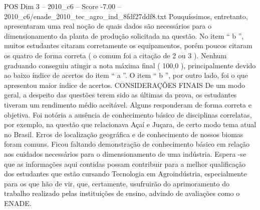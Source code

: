\begin{textsample}{POS Dim 3 – 2010\_c6 – Score -7.00 – 2010\_c6/enade\_2010\_tec\_agro\_ind\_8fdf27ddf8.txt}
Pouquíssimos, entretanto, apresentaram uma real noção de quais dados são necessários para o dimensionamento da planta de produção solicitada na questão.
No item “ b ”, muitos estudantes citaram corretamente os equipamentos, porém poucos citaram os quatro de forma correta ( o comum foi a citação de 2 ou 3 ).
Nenhum graduando conseguiu atingir a nota máxima final ( 100,0 ), principalmente devido ao baixo índice de acertos do item “ a ”.
O item “ b ”, por outro lado, foi o que apresentou maior índice de acertos.
CONSIDERAÇÕES FINAIS De um modo geral, a despeito das questões terem sido as últimas da prova, os estudantes tiveram um rendimento médio aceitável.
Alguns responderam de forma correta e objetiva.
Foi notória a ausência de conhecimento básico de disciplinas correlatas, por exemplo, na questão que relacionava Açaí e Juçara, de certo modo tema atual no Brasil.
Erros de localização geográfica e de conhecimento de nossos biomas foram comuns.
Ficou faltando demonstração de conhecimento básico em relação aos cuidados necessários para o dimensionamento de uma indústria.
Espera -se que as informações aqui contidas possam contribuir para a melhor qualificação dos estudantes que estão cursando Tecnologia em Agroindústria, especialmente para os que hão de vir, que, certamente, usufruirão do aprimoramento do trabalho realizado pelas instituições de ensino, advindo de avaliações como o ENADE.

\end{textsample}
